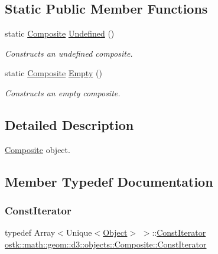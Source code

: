 \subsection*{Static Public Member Functions}
\begin{DoxyCompactItemize}
\item 
static \hyperlink{classostk_1_1math_1_1geom_1_1d3_1_1objects_1_1_composite}{Composite} \hyperlink{classostk_1_1math_1_1geom_1_1d3_1_1objects_1_1_composite_abd7585518f349e7d599a81102f9e0e41}{Undefined} ()
\begin{DoxyCompactList}\small\item\em Constructs an undefined composite. \end{DoxyCompactList}\item 
static \hyperlink{classostk_1_1math_1_1geom_1_1d3_1_1objects_1_1_composite}{Composite} \hyperlink{classostk_1_1math_1_1geom_1_1d3_1_1objects_1_1_composite_ab6ca471e3e731465d64148506869c93d}{Empty} ()
\begin{DoxyCompactList}\small\item\em Constructs an empty composite. \end{DoxyCompactList}\end{DoxyCompactItemize}


\subsection{Detailed Description}
\hyperlink{classostk_1_1math_1_1geom_1_1d3_1_1objects_1_1_composite}{Composite} object. 

\subsection{Member Typedef Documentation}
\mbox{\label{classostk_1_1math_1_1geom_1_1d3_1_1objects_1_1_composite_ab1f78408fec2e435dc1172cf2675b0a9}} 
\subsubsection{\texorpdfstring{Const\+Iterator}{ConstIterator}}
{\footnotesize\ttfamily typedef Array$<$Unique$<$\hyperlink{classostk_1_1math_1_1geom_1_1d3_1_1_object}{Object}$>$ $>$\+::\hyperlink{classostk_1_1math_1_1geom_1_1d3_1_1objects_1_1_composite_ab1f78408fec2e435dc1172cf2675b0a9}{Const\+Iterator} \hyperlink{classostk_1_1math_1_1geom_1_1d3_1_1objects_1_1_composite_ab1f78408fec2e435dc1172cf2675b0a9}{ostk\+::math\+::geom\+::d3\+::objects\+::\+Composite\+::\+Const\+Iterator}}



